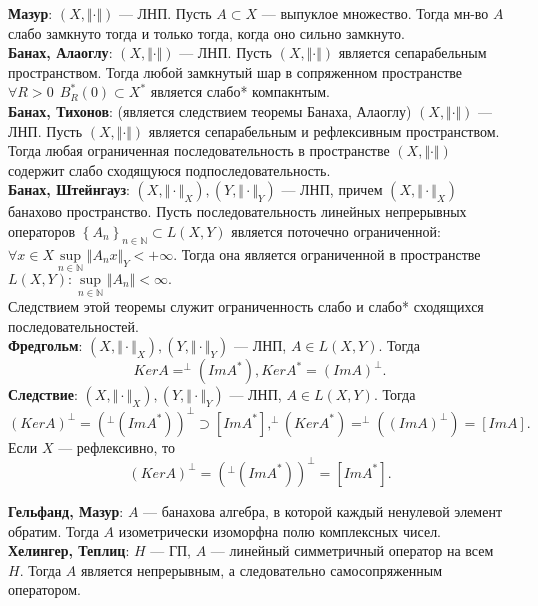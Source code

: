 \documentclass[12pt,a4paper]{scrartcl}
\begin{document}
\textbf{Мазур}: $(X, \Vert \cdot \Vert)$ — ЛНП. Пусть $A \subset X$ — выпуклое множество. Тогда мн-во $A$ слабо замкнуто тогда и только тогда, когда оно сильно замкнуто. \\

\textbf{Банах, Алаоглу}: $(X, \Vert \cdot \Vert)$ — ЛНП. Пусть $(X, \Vert \cdot \Vert)$ является сепарабельным пространством. Тогда любой замкнутый шар в сопряженном пространстве $\forall R > 0 \ \ B_R^{*}(0) \subset X^{*}$ является слабо* компакнтым. \\

\textbf{Банах, Тихонов}: (является следствием теоремы Банаха, Алаоглу) $(X, \Vert \cdot \Vert)$ — ЛНП. Пусть $(X, \Vert \cdot \Vert)$ является сепарабельным и рефлексивным пространством. Тогда любая ограниченная последовательность в пространстве $(X, \Vert \cdot \Vert)$ содержит слабо сходящуюся подпоследовательность. \\

\textbf{Банах, Штейнгауз}: $(X, \Vert \cdot \Vert_X), (Y, \Vert \cdot \Vert_Y)$ — ЛНП, причем $(X, \Vert \cdot \Vert_X)$ банахово пространство. Пусть последовательность линейных непрерывных операторов $\left\{A_n\right\}_{n \in \mathbb{N}} \subset L(X, Y)$ является поточечно ограниченной: $\forall x \in X \sup\limits_{n \in \mathbb{N}}\Vert A_nx\Vert_Y < +\infty.$ Тогда она является ограниченной в пространстве $L(X, Y):\sup\limits_{n \in \mathbb{N}}\Vert A_n\Vert < \infty.$\\
Следствием этой теоремы служит ограниченность слабо и слабо* сходящихся последовательностей.\\

\textbf{Фредгольм}: $(X, \Vert \cdot \Vert_X), (Y, \Vert \cdot \Vert_Y)$ — ЛНП, $A \in L(X, Y).$ Тогда
$$Ker A =  ^{\perp}(Im A^{*}), Ker A^{*} = (Im A)^{\bot}.$$
\textbf{Следствие}: $(X, \Vert \cdot \Vert_X), (Y, \Vert \cdot \Vert_Y)$ — ЛНП, $A \in L(X, Y).$ Тогда 
$$(Ker A)^{\bot} =  (^{\perp}(Im A^{*}))^{\bot} \supset [Im A^{*}], ^{\perp}(Ker A^{*}) = ^{\perp}((Im A)^{\bot}) = [Im A].$$
Если $X$ — рефлексивно, то 
$$(Ker A)^{\bot} =  (^{\perp}(Im A^{*}))^{\bot} = [Im A^{*}].$$

\textbf{Гельфанд, Мазур}: $A$ — банахова алгебра, в которой каждый ненулевой элемент обратим. Тогда $A$ изометрически изоморфна полю комплексных чисел. \\

\textbf{Хелингер, Теплиц}: $H$ — ГП, $A$ — линейный симметричный оператор на всем $H.$ Тогда $A$ является непрерывным, а следовательно самосопряженным оператором. \\
\end{document}
